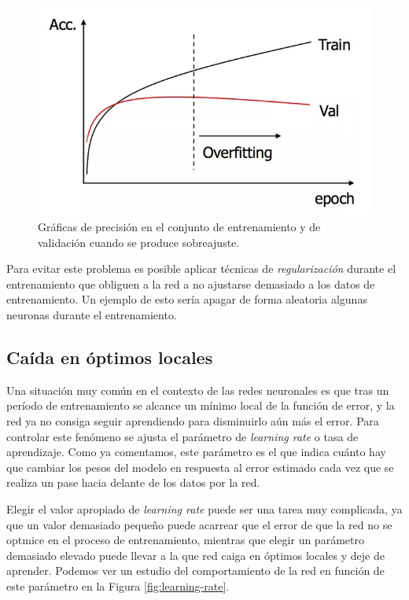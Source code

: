 \documentclass[
  a4paper,
  12pt,
  spanish,
]{scrartcl}
\theoremstyle{teorema-style}
\begin{document}
\begin{figure}[h]
  \centering
  \includegraphics[width=.7\textwidth]{img/overfitting}
  \caption{Gráficas de precisión en el conjunto de entrenamiento y de validación cuando se produce sobreajuste.}
  \label{fig:overfitting}
\end{figure}

Para evitar este problema es posible aplicar técnicas de \textit{regularización} durante el entrenamiento que obliguen a la red a no ajustarse demasiado a los datos de entrenamiento. Un ejemplo de esto sería apagar de forma aleatoria algunas neuronas durante el entrenamiento.

\subsection{Caída en óptimos locales}

Una situación muy común en el contexto de las redes neuronales es que tras un período de entrenamiento se alcance un mínimo local de la función de error, y la red ya no consiga seguir aprendiendo para disminuirlo aún más el error. Para controlar este fenómeno se ajusta el parámetro de \textit{learning rate} o tasa de aprendizaje. Como ya comentamos, este parámetro es el que indica cuánto hay que cambiar los pesos del modelo en respuesta al error estimado cada vez que se realiza un pase hacia delante de los datos por la red.

Elegir el valor apropiado de \textit{learning rate} puede ser una tarea muy complicada, ya que un valor demasiado pequeño puede acarrear que el error de que la red no se optmice en el proceso de entrenamiento, mientras que elegir un parámetro demasiado elevado puede llevar a la que red caiga en óptimos locales y deje de aprender. Podemos ver un estudio del comportamiento de la red en función de este parámetro en la Figura \ref{fig:learning-rate}.
\end{document}
